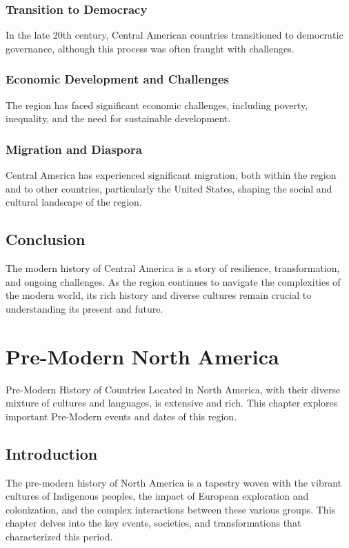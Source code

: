 \documentclass[a4paper,12pt]{book}
\begin{document}
\subsection{Transition to Democracy}
\label{subsec:transition-democracy}
In the late 20th century, Central American countries transitioned to democratic governance, although this process was often fraught with challenges.

\subsection{Economic Development and Challenges}
\label{subsec:economic-development-challenges}
The region has faced significant economic challenges, including poverty, inequality, and the need for sustainable development.

\subsection{Migration and Diaspora}
\label{subsec:migration-diaspora}
Central America has experienced significant migration, both within the region and to other countries, particularly the United States, shaping the social and cultural landscape of the region.

\section{Conclusion}
\label{sec:conclusion-modern-central-america}
The modern history of Central America is a story of resilience, transformation, and ongoing challenges. As the region continues to navigate the complexities of the modern world, its rich history and diverse cultures remain crucial to understanding its present and future.

\chapter{Pre-Modern North America}
\label{ch:pre-modern-history-north-america}

Pre-Modern History of Countries Located in North America, with their diverse mixture of cultures and languages, is extensive and rich. This chapter explores important Pre-Modern events and dates of this region.

\section{Introduction}
\label{sec:introduction-north-america}
The pre-modern history of North America is a tapestry woven with the vibrant cultures of Indigenous peoples, the impact of European exploration and colonization, and the complex interactions between these various groups. This chapter delves into the key events, societies, and transformations that characterized this period.
\end{document}
